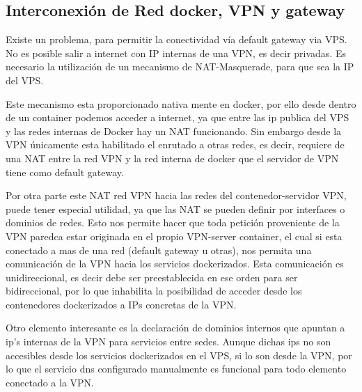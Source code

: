 \subsection{Interconexión de Red docker, VPN y gateway}

Existe un problema, para permitir la conectividad vía default gateway via VPS. No es posible salir a internet con IP internas de una VPN, es decir privadas. Es necesario la utilización de un mecanismo de NAT-Masquerade, para que sea la IP del VPS.

Este mecanismo esta proporcionado nativa mente en docker, por ello desde dentro de un container podemos acceder a internet, ya que entre las ip publica del VPS y las redes internas de Docker hay un NAT funcionando. Sin embargo desde la VPN únicamente esta habilitado el enrutado a otras redes, es decir, requiere de una NAT entre la red VPN y la red interna de docker que el servidor de VPN tiene como default gateway.

Por otra parte este NAT red VPN hacia las redes del contenedor-servidor VPN, puede tener especial utilidad, ya que las NAT se pueden definir por interfaces o dominios de redes. Esto nos permite hacer que toda petición proveniente de la VPN paredca estar originada en el propio VPN-server container, el cual si esta conectado a mas de una red (default gateway u otras), nos permita una comunicación  de la VPN hacia los servicios dockerizados. Esta comunicación es unidireccional, es decir debe ser preestablecida en ese orden para ser bidireccional, por lo que inhabilita la posibilidad de acceder desde los contenedores dockerizados a IPs concretas de la VPN.

Otro elemento interesante es la declaración de dominios internos que apuntan a ip's internas de la VPN para servicios entre sedes. Aunque dichas ips no son accesibles desde los servicios dockerizados en el VPS, si lo son desde la VPN, por lo que el servicio dns configurado manualmente es funcional para todo elemento conectado a la VPN.

